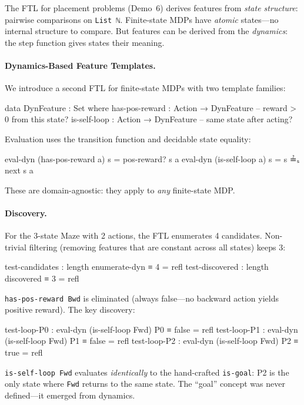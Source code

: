 The FTL for placement problems (Demo~6) derives features from \emph{state structure}: pairwise comparisons on \texttt{List~ℕ}.  Finite-state MDPs have \emph{atomic} states---no internal structure to compare.  But features can be derived from the \emph{dynamics}: the step function gives states their meaning.

\paragraph{Dynamics-Based Feature Templates.}
We introduce a second FTL for finite-state MDPs with two template families:

\begin{spec}
data DynFeature : Set where
  has-pos-reward : Action → DynFeature   -- reward > 0 from this state?
  is-self-loop   : Action → DynFeature   -- same state after acting?
\end{spec}

Evaluation uses the transition function and decidable state equality:
\begin{spec}
eval-dyn (has-pos-reward a) s = pos-reward? s a
eval-dyn (is-self-loop a)   s = s ≟ₛ next s a
\end{spec}

These are domain-agnostic: they apply to \emph{any} finite-state MDP.

\paragraph{Discovery.}  For the 3-state Maze with 2 actions, the FTL enumerates 4 candidates.  Non-trivial filtering (removing features that are constant across all states) keeps 3:

\begin{spec}
test-candidates : length enumerate-dyn ≡ 4    = refl
test-discovered : length discovered ≡ 3        = refl
\end{spec}

\noindent \texttt{has-pos-reward~Bwd} is eliminated (always false---no backward action yields positive reward).  The key discovery:

\begin{spec}
test-loop-P0 : eval-dyn (is-self-loop Fwd) P0 ≡ false  = refl
test-loop-P1 : eval-dyn (is-self-loop Fwd) P1 ≡ false  = refl
test-loop-P2 : eval-dyn (is-self-loop Fwd) P2 ≡ true   = refl
\end{spec}

\noindent \texttt{is-self-loop~Fwd} evaluates \emph{identically} to the hand-crafted \texttt{is-goal}: P2 is the only state where \texttt{Fwd} returns to the same state.  The ``goal'' concept was never defined---it emerged from dynamics.


